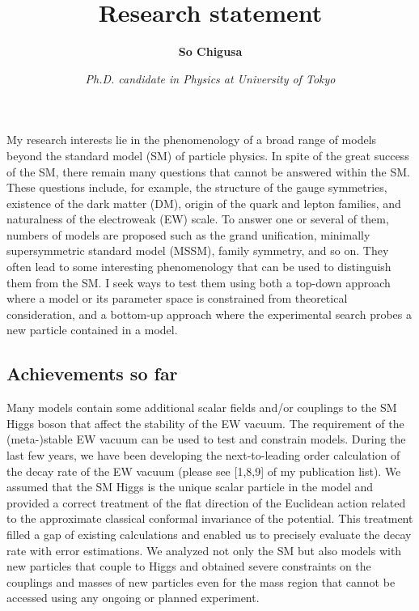 \documentclass[12pt,notitlepage]{article}
\title{\vspace*{-3cm}Research statement}
\author{\textbf{So Chigusa}}
\date{\vspace*{-4mm}\textit{Ph.D. candidate in Physics at University of Tokyo}}
\begin{document}
\maketitle

My research interests lie in the phenomenology of a broad range of models beyond the standard model (SM) of particle physics.
In spite of the great success of the SM, there remain many questions that cannot be answered within the SM.
These questions include, for example, the structure of the gauge symmetries, existence of the dark matter (DM), origin of the quark and lepton families, and naturalness of the electroweak (EW) scale.
To answer one or several of them, numbers of models are proposed such as the grand unification, minimally supersymmetric standard model (MSSM), family symmetry, and so on.
They often lead to some interesting phenomenology that can be used to distinguish them from the SM.
I seek ways to test them using both a top-down approach where a model or its parameter space is constrained from theoretical consideration, and a bottom-up approach where the experimental search probes a new particle contained in a model.

\vspace*{-2mm}
\subsection*{Achievements so far}


Many models contain some additional scalar fields and/or couplings to the SM Higgs boson that affect the stability of the EW vacuum.
The requirement of the (meta-)stable EW vacuum can be used to test and constrain models.
During the last few years, we have been developing the next-to-leading order calculation of the decay rate of the EW vacuum (please see [1,8,9] of my publication list).
We assumed that the SM Higgs is the unique scalar particle in the model and provided a correct treatment of the flat direction of the Euclidean action related to the approximate classical conformal invariance of the potential.
This treatment filled a gap of existing calculations and enabled us to precisely evaluate the decay rate with error estimations.
We analyzed not only the SM but also models with new particles that couple to Higgs and obtained severe constraints on the couplings and masses of new particles even for the mass region that cannot be accessed using any ongoing or planned experiment.
\end{document}
